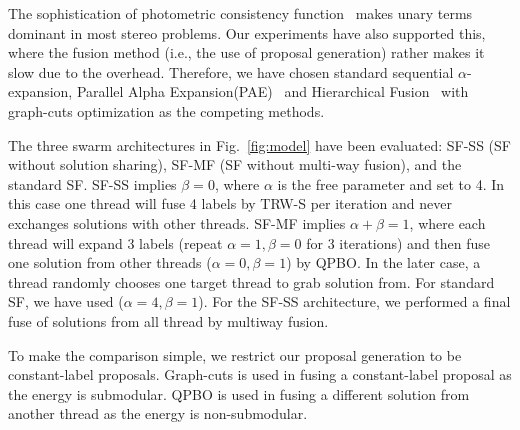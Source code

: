 %


\noindent The sophistication of photometric consistency
function~\cite{mvs_furukawa_survey} makes unary terms dominant in most
stereo problems.  Our experiments have also supported this, where the
fusion method (i.e., the use of proposal generation) rather makes it
slow due to the overhead. Therefore, we have chosen standard sequential
$\alpha$-expansion, Parallel Alpha Expansion(PAE)~\cite{delong} and
Hierarchical Fusion~\cite{delong,olga} with graph-cuts optimization as
the competing methods.




\noindent The three swarm architectures in Fig.~\ref{fig:model} have
been evaluated: SF-SS (SF without solution sharing), SF-MF (SF without
multi-way fusion), and the standard SF.
%
SF-SS implies $\beta=0$, where $\alpha$ is the free parameter and set
to 4. In this case one thread will fuse 4 labels by TRW-S per
iteration and never exchanges solutions with other threads. SF-MF
implies $\alpha+\beta=1$, where each thread will expand 3 labels
(repeat $\alpha=1, \beta=0$ for 3 iterations) and then fuse one
solution from other threads ($\alpha=0, \beta=1$) by QPBO. In the later
case, a thread randomly chooses one target thread to grab solution
from. For standard SF, we have used ($\alpha=4, \beta=1$). For the
SF-SS architecture, we performed a final fuse of solutions from all
thread by multiway fusion.

%
%
%
%
To make the comparison simple, we restrict our proposal generation to
be constant-label proposals. Graph-cuts is used in fusing a
constant-label proposal as the energy is submodular. QPBO is used in
fusing a different solution from another thread as the energy is
non-submodular.
%
